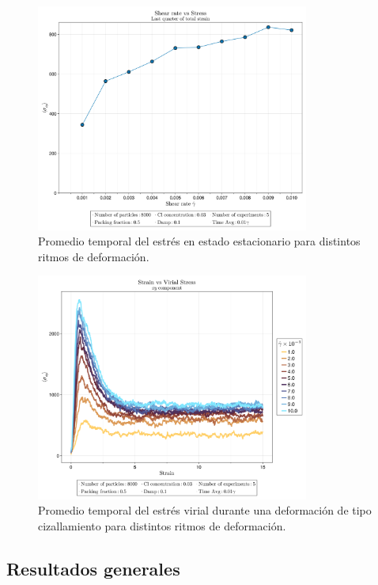 \documentclass[../main.tex]{subfiles}
\begin{document}
\begin{figure}[h]
    \centering
    \includegraphics[width=0.8\textwidth]{../Figures/system-2025-05-22-194804-CL-0.03/ShearRate-vs-Stress.png}
    \caption{
        Promedio temporal del estrés en estado estacionario para distintos ritmos de deformación.
    }\label{fig:shear-rate-vs-stress}
\end{figure}

\begin{figure}[h]
    \centering
    \includegraphics[width=0.8\textwidth]{../Figures/system-2025-05-22-194804-CL-0.03/Strain-vs-StressVirialXY.png}
    \caption{
        Promedio temporal del estrés virial durante una deformación de tipo cizallamiento para distintos ritmos de deformación.
    }\label{fig:strain-vs-stress}
\end{figure}



\subsection{Resultados generales}
\end{document}
